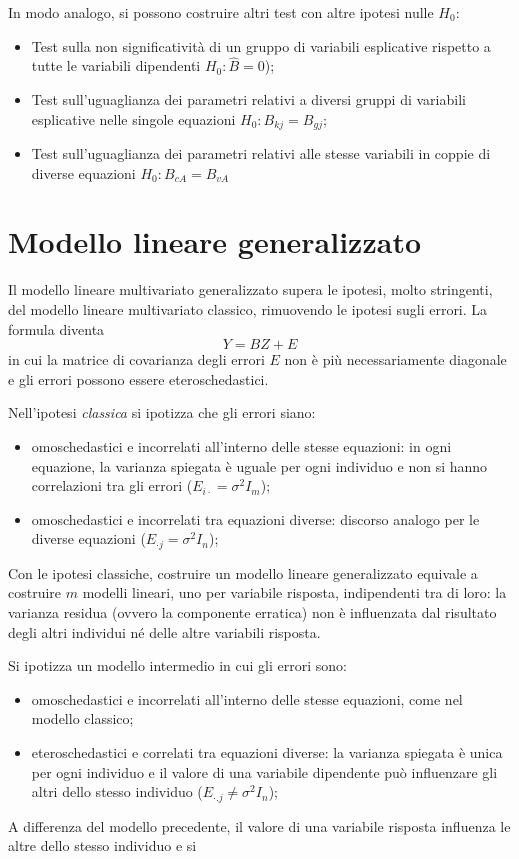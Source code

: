 \documentclass[a4page, 11pt]{article} %
\begin{document}
In modo analogo, si possono costruire altri test con altre ipotesi nulle $H_0$:
\begin{itemize}[noitemsep]
\item Test sulla non significatività di un gruppo di variabili esplicative rispetto a tutte le variabili dipendenti $H_0 : \hat{B} = 0$);
\item Test sull’uguaglianza dei parametri relativi a diversi gruppi di variabili esplicative nelle singole equazioni $H_0 : B_{kj} = B_{gj}$;
\item Test sull'uguaglianza dei parametri relativi alle stesse variabili in coppie di diverse equazioni $H_0 : B_{cA} = B_{vA}$
\end{itemize}


\section{Modello lineare generalizzato}
Il modello lineare multivariato generalizzato supera le ipotesi, molto stringenti, del modello lineare multivariato classico, rimuovendo le ipotesi sugli errori.
La formula diventa
\begin{equation*}
  Y = BZ+E
\end{equation*}
in cui la matrice di covarianza degli errori $E$ non è più necessariamente diagonale e gli errori possono essere eteroschedastici. 

Nell’ipotesi \textit{classica} si ipotizza che gli errori siano:
\begin{itemize}[noitemsep]
\item omoschedastici e incorrelati all’interno delle stesse equazioni: in ogni equazione, la varianza spiegata è uguale per ogni individuo e non si hanno correlazioni tra gli errori ($E_{i \cdot} = \sigma^2 I_m$);
\item omoschedastici e incorrelati tra equazioni diverse: discorso analogo per le diverse equazioni ($E_{\cdot j} = \sigma^2I_n$);
\end{itemize}

Con le ipotesi classiche, costruire un modello lineare generalizzato equivale a costruire $m$ modelli lineari, uno per variabile risposta, indipendenti tra di loro: la varianza residua (ovvero la componente erratica) non è influenzata dal risultato degli altri individui né delle altre variabili risposta.

Si ipotizza un modello intermedio in cui gli errori sono:
\begin{itemize}[noitemsep]
\item omoschedastici e incorrelati all’interno delle stesse equazioni, come nel modello classico;
\item eteroschedastici e correlati tra equazioni diverse: la varianza spiegata è unica per ogni individuo e il valore di una variabile dipendente può influenzare gli altri dello stesso individuo ($E_{\cdot.j} \ne \sigma^2 I_n$);
\end{itemize}
A differenza del modello precedente, il valore di una variabile risposta influenza le altre dello stesso individuo e si 
\end{document}
